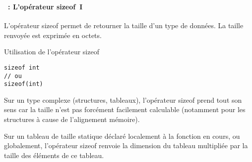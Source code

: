 \begin{frame}[containsverbatim]
  \frametitle{\secname}
  \framesubtitle{\subsecname~: L'opérateur sizeof~I}

  L'opérateur sizeof permet de retourner la taille d'un type de données. La taille renvoyée est exprimée en octets.
  \vspace{0.3cm}
  \begin{exampleblock}{Utilisation de l'opérateur sizeof}
    \begin{verbatim}
sizeof int
// ou
sizeof(int)\end{verbatim}
  \end{exampleblock}
  \par
  Sur un type complexe (structures, tableaux), l'opérateur sizeof prend tout son sens car la taille n'est pas forcément facilement calculable (notamment pour les structures à cause de l'alignement mémoire).
  \vspace{0.3cm}
  \par
  Sur un tableau de taille statique déclaré localement à la fonction en cours, ou globalement, l'opérateur sizeof renvoie la 
  dimension du tableau multipliée par la taille des éléments de ce tableau.
\end{frame}

